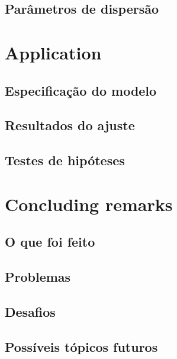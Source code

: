 \documentclass[AMA,STIX1COL]{WileyNJD-v2}
\begin{document}
\subsection{Parâmetros de dispersão}


\section{Application}\label{sec7}

\subsection{Especificação do modelo}
  
\subsection{Resultados do ajuste}

\subsection{Testes de hipóteses}
  

\section{Concluding remarks}\label{sec8}

\subsection{O que foi feito}

\subsection{Problemas}

\subsection{Desafios}

\subsection{Possíveis tópicos futuros}

\end{document}
